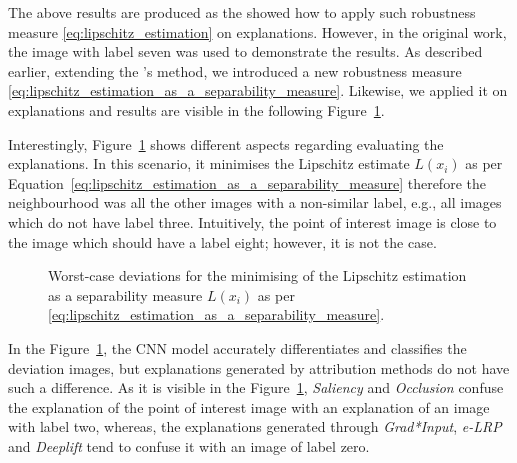 \documentclass[english]{tktltiki2}
\theoremstyle{definition}
\theoremstyle{remark}
\begin{document}
The above results are produced as the \citet{alvarez2018robustness} showed how to apply such robustness measure \eqref{eq:lipschitz_estimation} on explanations. However, in the original work, the image with label seven was used to demonstrate the results. As described earlier, extending the \citet{alvarez2018robustness}'s method, we introduced a new robustness measure \eqref{eq:lipschitz_estimation_as_a_separability_measure}. Likewise, we applied it on explanations and results are visible in the following Figure~\ref{fig:digit3_deviations_separability}.

Interestingly, Figure~\ref{fig:digit3_deviations_separability} shows different aspects regarding evaluating the explanations. In this scenario, it minimises the Lipschitz estimate $L(x_i)$ as per Equation~\eqref{eq:lipschitz_estimation_as_a_separability_measure} therefore the neighbourhood was all the other images with a non-similar label, e.g., all images which do not have label three. Intuitively, the point of interest image is close to the image which should have a label eight; however, it is not the case. 

\begin{figure}[H]
	\vspace*{-5mm}
	\centering
	\qquad
	\qquad
	\qquad
	\qquad
	\caption{Worst-case deviations for the minimising of the Lipschitz estimation as a separability measure $L(x_i)$ as per \eqref{eq:lipschitz_estimation_as_a_separability_measure}.}%
	\label{fig:digit3_deviations_separability}%
\end{figure}

In the Figure~\ref{fig:digit3_deviations_separability}, the CNN model accurately differentiates and classifies the deviation images, but explanations generated by attribution methods do not have such a difference. As it is visible in the Figure~\ref{fig:digit3_deviations_separability}, \textit{Saliency} and \textit{Occlusion} confuse the explanation of the point of interest image with an explanation of an image with label two, whereas, the explanations generated through \textit{Grad*Input}, \textit{e-LRP} and \textit{Deeplift} tend to confuse it with an image of label zero.
\end{document}
